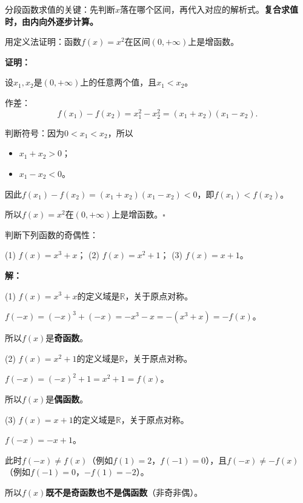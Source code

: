 \documentclass[12pt, a4paper]{ctexart}
\begin{document}
\begin{tipbox}[方法总结]
分段函数求值的关键：先判断$x$落在哪个区间，再代入对应的解析式。\textbf{复合求值时，由内向外逐步计算。}
\end{tipbox}

\vspace{6pt}

\begin{examplebox}[【例5】定义法证明单调性]
用定义法证明：函数$f(x)=x^2$在区间$(0,+\infty)$上是增函数。
\end{examplebox}

\textbf{证明：}

设$x_1, x_2$是$(0,+\infty)$上的任意两个值，且$x_1 < x_2$。

作差：
\[f(x_1)-f(x_2)=x_1^2-x_2^2=(x_1+x_2)(x_1-x_2).\]

判断符号：因为$0 < x_1 < x_2$，所以
\begin{itemize}[leftmargin=2em]
  \item $x_1+x_2>0$；
  \item $x_1-x_2<0$。
\end{itemize}
因此$f(x_1)-f(x_2)=(x_1+x_2)(x_1-x_2)<0$，即$f(x_1)<f(x_2)$。

所以$f(x)=x^2$在$(0,+\infty)$上是增函数。\hfill$\square$

\vspace{6pt}

\begin{examplebox}[【例6】判断函数的奇偶性]
判断下列函数的奇偶性：

(1) $f(x)=x^3+x$；\quad
(2) $f(x)=x^2+1$；\quad
(3) $f(x)=x+1$。
\end{examplebox}

\textbf{解：}

(1) $f(x)=x^3+x$的定义域是$\mathbb{R}$，关于原点对称。

$f(-x)=(-x)^3+(-x)=-x^3-x=-(x^3+x)=-f(x)$。

所以$f(x)$是\textbf{奇函数}。

(2) $f(x)=x^2+1$的定义域是$\mathbb{R}$，关于原点对称。

$f(-x)=(-x)^2+1=x^2+1=f(x)$。

所以$f(x)$是\textbf{偶函数}。

(3) $f(x)=x+1$的定义域是$\mathbb{R}$，关于原点对称。

$f(-x)=-x+1$。

此时$f(-x)\neq f(x)$（例如$f(1)=2$，$f(-1)=0$），且$f(-x)\neq -f(x)$（例如$f(-1)=0$，$-f(1)=-2$）。

所以$f(x)$\textbf{既不是奇函数也不是偶函数}（非奇非偶）。
\end{document}
